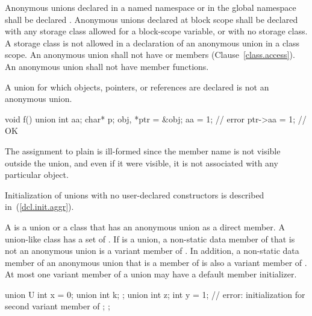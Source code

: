 \pnum
{}%
%
Anonymous unions declared in a named namespace or in the global
namespace shall be declared . Anonymous unions declared at
block scope shall be declared with any storage class allowed for a
block-scope variable, or with no storage class. A storage class is not
allowed in a declaration of an anonymous union in a class scope.
%
%
An anonymous union shall not have  or 
members (Clause~\ref{class.access}). An anonymous union shall not have
member functions.

\pnum
A union for which objects, pointers, or references are declared is not an anonymous union.
\begin{example}

\begin{codeblock}
void f() {
  union { int aa; char* p; } obj, *ptr = &obj;
  aa = 1;                         // error
  ptr->aa = 1;                    // OK
}
\end{codeblock}

The assignment to plain  is ill-formed since the member name
is not visible outside the union, and even if it were visible, it is not
associated with any particular object.
\end{example}
\begin{note}
Initialization of unions with no user-declared constructors is described
in~(\ref{dcl.init.aggr}).
\end{note}

\pnum
{}%
%
A  is a union or a class that has an anonymous union as a direct
member. A union-like class  has a set of .
If  is a union, a non-static data member of  that is not an anonymous
union is a variant member of . In addition, a non-static data member of an
anonymous union that is a member of  is also a variant member of .
At most one variant member of a union may have a default member initializer.
\begin{example}

\begin{codeblock}
union U {
  int x = 0;
  union {
    int k;
  };
  union {
    int z;
    int y = 1; // error: initialization for second variant member of 
  };
};
\end{codeblock}

\end{example}

